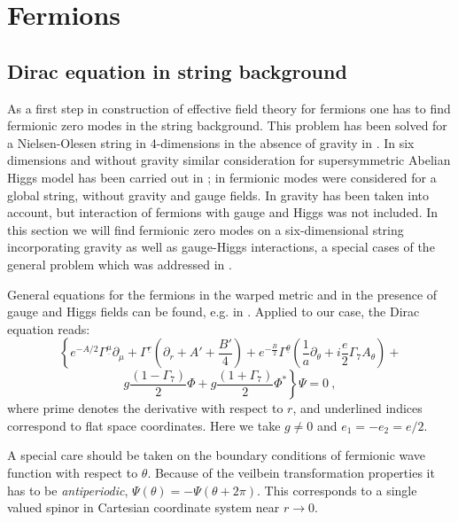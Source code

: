 \documentclass[a4paper,12pt]{article}
\begin{document}
\section{Fermions} 
\subsection{Dirac equation in string background} 
As a first step in construction of effective field theory for
fermions one has to find fermionic zero modes in the string
background. This problem has been solved for a Nielsen-Olesen string in
4-dimensions in the absence of gravity in \cite{Jackiw:1981ee}. In
six dimensions and without gravity similar consideration for
supersymmetric Abelian Higgs model has been carried out in
\cite{Hughes:fa}; in \cite{Libanov:2000uf,Frere:2000dc} fermionic
modes were considered for a global string, without gravity and gauge
fields. In \cite{Neronov:2001qv} gravity has been taken into account,
but interaction of fermions with gauge and Higgs was not included. In
this section we will find fermionic zero modes on a six-dimensional
string incorporating gravity as well as gauge-Higgs interactions, a
special cases of the general problem which was addressed in
\cite{Randjbar-Daemi:2000cr}.

General equations for the fermions in the warped metric
and in the presence of gauge and Higgs fields can be found, e.g. in
\cite{Randjbar-Daemi:2000cr}. Applied to our case, the Dirac equation
reads:
\begin{equation}
\left\{
e^{-A/2}\Gamma^{\underline \mu}  \partial_\mu + \Gamma^{\underline r}
\left(\partial_r + A' +\frac{B'}{4}\right)
+e^{-\frac{B}{2}}\Gamma^{\underline\theta}
\left(\frac{1}{a}\partial_\theta
+i\frac{e}{2}\Gamma_7A_\theta\right)+\right.
\label{dirac}
\end{equation}
\[
\left. g\frac{(1-\Gamma_7)}{2}\Phi +g\frac{(1+\Gamma_7)}{2}\Phi^*
\right\}\Psi =0~,
\]
where prime denotes the derivative with respect to $r$, and underlined
indices correspond to flat space coordinates. Here we take $g \neq 0$
and $e_1=-e_2=e/2$.

A special care should be taken on the boundary conditions of
fermionic wave function with respect to $\theta$.  Because of the
veilbein transformation properties it has to be {\it antiperiodic},
$\Psi(\theta)=-\Psi(\theta+2\pi)$. This corresponds to a single valued
spinor in Cartesian coordinate system near $r\rightarrow 0$.
\end{document}
